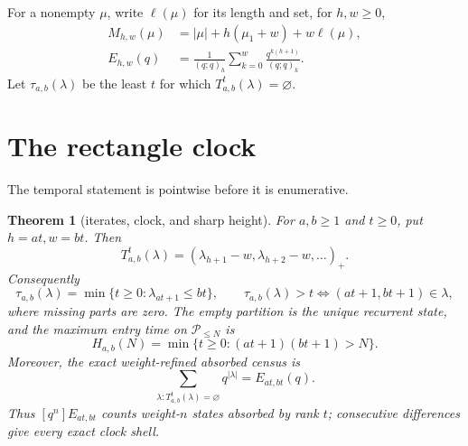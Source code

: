\documentclass[a4paper,10pt]{amsart}
\newtheorem{theorem}{Theorem}
\theoremstyle{remark}
\newcommand{\Part}{\mathcal P}
\newcommand{\elln}{\ell}
\newcommand{\emptypar}{\varnothing}
\newcommand{\qfac}[1]{(q;q)_{#1}}
\begin{document}
For a nonempty $\mu$, write $\elln(\mu)$ for its length and set, for
$h,w\geq0$,
\begin{align}
 M_{h,w}(\mu)&=|\mu|+h(\mu_1+w)+w\elln(\mu),\label{eq:M}\\
 E_{h,w}(q)&=\frac1{\qfac h}\sum_{k=0}^{w}
       \frac{q^{k(h+1)}}{\qfac k}.\label{eq:E}
\end{align}
Let $\tau_{a,b}(\lambda)$ be the least $t$ for which
$T_{a,b}^{t}(\lambda)=\emptypar$.

\section{The rectangle clock}\label{sec:clock}

The temporal statement is pointwise before it is enumerative.

\begin{theorem}[iterates, clock, and sharp height]\label{thm:clock}
For $a,b\geq1$ and $t\geq0$, put $h=at,w=bt$.  Then
\begin{equation}\label{eq:iterate}
 T_{a,b}^{t}(\lambda)
   =(\lambda_{h+1}-w,\lambda_{h+2}-w,\ldots)_+.
\end{equation}
Consequently
\begin{equation}\label{eq:point-clock}
 \tau_{a,b}(\lambda)=\min\{t\geq0:\lambda_{at+1}\leq bt\},
 \qquad
 \tau_{a,b}(\lambda)>t\iff (at+1,bt+1)\in\lambda,
\end{equation}
where missing parts are zero.  The empty partition is the unique recurrent
state, and the maximum entry time on $\Part_{\leq N}$ is
\begin{equation}\label{eq:height}
 H_{a,b}(N)=\min\{t\geq0:(at+1)(bt+1)>N\}.
\end{equation}
Moreover, the exact weight-refined absorbed census is
\begin{equation}\label{eq:absorbed}
 \sum_{\lambda:T_{a,b}^{t}(\lambda)=\emptypar}q^{|\lambda|}
   =E_{at,bt}(q).
\end{equation}
Thus $[q^n]E_{at,bt}$ counts weight-$n$ states absorbed by rank $t$;
consecutive differences give every exact clock shell.
\end{theorem}
\end{document}
